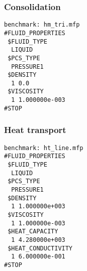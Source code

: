{%
\subsubsection{Consolidation}

\begin{verbatim}
benchmark: hm_tri.mfp
#FLUID_PROPERTIES
 $FLUID_TYPE
  LIQUID
 $PCS_TYPE
  PRESSURE1
 $DENSITY
  1 0.0
 $VISCOSITY
  1 1.000000e-003
#STOP
\end{verbatim}

\subsubsection{Heat transport}

\begin{verbatim}
benchmark: ht_line.mfp
#FLUID_PROPERTIES
 $FLUID_TYPE
  LIQUID
 $PCS_TYPE
  PRESSURE1
 $DENSITY
  1 1.000000e+003
 $VISCOSITY
  1 1.000000e-003
 $HEAT_CAPACITY
  1 4.280000e+003
 $HEAT_CONDUCTIVITY
  1 6.000000e-001
#STOP
\end{verbatim}

} %


